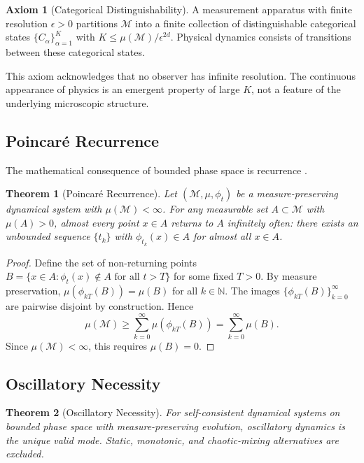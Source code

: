 \documentclass[twocolumn,10pt,a4paper]{article}
\newtheorem{theorem}{Theorem}[section]
\theoremstyle{definition}
\newtheorem{axiom}{Axiom}
\theoremstyle{remark}
\newcommand{\Mspace}{\mathcal{M}}
\newcommand{\Natural}{\mathbb{N}}
\begin{document}
\begin{axiom}[Categorical Distinguishability]
\label{ax:categorical}
A measurement apparatus with finite resolution $\epsilon > 0$ partitions $\Mspace$ into a finite collection of distinguishable categorical states $\{C_\alpha\}_{\alpha=1}^{K}$ with $K \leq \mu(\Mspace)/\epsilon^{2d}$. Physical dynamics consists of transitions between these categorical states.
\end{axiom}

This axiom acknowledges that no observer has infinite resolution. The continuous appearance of physics is an emergent property of large $K$, not a feature of the underlying microscopic structure.

\subsection{Poincar\'{e} Recurrence}

The mathematical consequence of bounded phase space is recurrence \citep{poincare1890}.

\begin{theorem}[Poincar\'{e} Recurrence]
\label{thm:poincare}
Let $(\Mspace, \mu, \phi_t)$ be a measure-preserving dynamical system with $\mu(\Mspace) < \infty$. For any measurable set $A \subset \Mspace$ with $\mu(A) > 0$, almost every point $x \in A$ returns to $A$ infinitely often: there exists an unbounded sequence $\{t_k\}$ with $\phi_{t_k}(x) \in A$ for almost all $x \in A$.
\end{theorem}

\begin{proof}
Define the set of non-returning points $B = \{x \in A : \phi_t(x) \notin A \text{ for all } t > T\}$ for some fixed $T > 0$. By measure preservation, $\mu(\phi_{kT}(B)) = \mu(B)$ for all $k \in \Natural$. The images $\{\phi_{kT}(B)\}_{k=0}^{\infty}$ are pairwise disjoint by construction. Hence
\[
\mu(\Mspace) \geq \sum_{k=0}^{\infty} \mu(\phi_{kT}(B)) = \sum_{k=0}^{\infty}\mu(B).
\]
Since $\mu(\Mspace) < \infty$, this requires $\mu(B) = 0$.
\end{proof}

\subsection{Oscillatory Necessity}

\begin{theorem}[Oscillatory Necessity]
\label{thm:oscillatory}
For self-consistent dynamical systems on bounded phase space with measure-preserving evolution, oscillatory dynamics is the unique valid mode. Static, monotonic, and chaotic-mixing alternatives are excluded.
\end{theorem}
\end{document}
